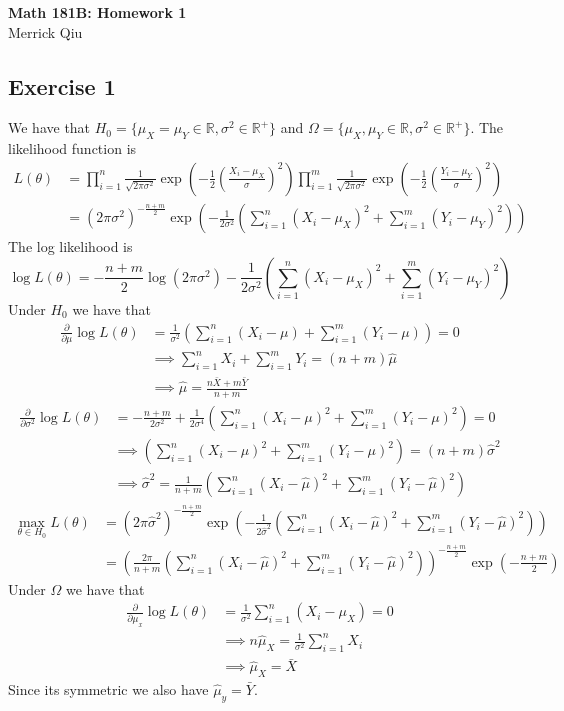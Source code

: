 \documentclass{article}
\newcommand{\sumN}{\sum_{i=1}^{n}}
\newcommand{\sumM}{\sum_{i=1}^{m}}
\newcommand{\prodN}{\prod_{i=1}^{n}}
\newcommand{\prodM}{\prod_{i=1}^{m}}
\begin{document}
\begin{center}
	\huge{\bf Math 181B: Homework 1} \\
	Merrick Qiu 
\end{center}

\subsection*{Exercise 1}
We have that 
$H_0 = \{\mu_X = \mu_Y \in \mathbb{R}, \sigma^2 \in \mathbb{R}^+\}$ and
$\Omega = \{\mu_X, \mu_Y \in \mathbb{R}, \sigma^2 \in \mathbb{R}^+\}$.
The likelihood function is 
\begin{align*}
	L(\theta) &= \prodN \frac{1}{\sqrt{2\pi\sigma^2}} \exp\left(-\frac{1}{2}\left(\frac{X_i-\mu_X}{\sigma}\right)^2\right)
				 \prodM \frac{1}{\sqrt{2\pi\sigma^2}} \exp\left(-\frac{1}{2}\left(\frac{Y_i-\mu_Y}{\sigma}\right)^2\right) \\
	&= (2\pi\sigma^2)^{-\frac{n+m}{2}} \exp \left(-\frac{1}{2\sigma^2}\left(\sumN (X_i - \mu_X)^2 + \sumM (Y_i - \mu_Y)^2 \right)\right)
\end{align*}
The log likelihood is 
\[
	\log L(\theta) = -\frac{n+m}{2} \log(2\pi\sigma^2) -\frac{1}{2\sigma^2}\left(\sumN (X_i - \mu_X)^2 + \sumM (Y_i - \mu_Y)^2\right)
\]
Under $H_0$ we have that 
\begin{align*}
	\frac{\partial}{\partial \mu } \log L(\theta) &=
	\frac{1}{\sigma^2}\left(\sumN (X_i - \mu) + \sumM (Y_i - \mu)\right)
	= 0 \\
	&\implies \sumN X_i + \sumM Y_i = (n+m)\hat{\mu} \\
	&\implies \hat{\mu} = \frac{n\bar{X} + m\bar{Y}}{n+m} 
\end{align*}
\begin{align*}
	\frac{\partial}{\partial \sigma^2 } \log L(\theta) &=
	-\frac{n+m}{2\sigma^2} +\frac{1}{2\sigma^4}\left(\sumN (X_i - \mu)^2 + \sumM (Y_i - \mu)^2\right)
	= 0 \\
	&\implies \left(\sumN (X_i - \mu)^2 + \sumM (Y_i - \mu)^2\right) = (n+m)\hat{\sigma}^2 \\
	&\implies \hat{\sigma}^2 = \frac{1}{n+m}\left(\sumN (X_i - \hat{\mu})^2 + \sumM (Y_i - \hat{\mu})^2\right)
\end{align*}
\begin{align*}
	\max_{\theta \in H_0} L(\theta) &=
	(2\pi\hat{\sigma}^2)^{-\frac{n+m}{2}} \exp \left(-\frac{1}{2\hat{\sigma}^2}\left(\sumN (X_i - \hat{\mu})^2 + \sumM (Y_i - \hat{\mu})^2 \right)\right) \\
	&= \left(\frac{2\pi}{n+m}\left(\sumN (X_i - \hat{\mu})^2 + \sumM (Y_i - \hat{\mu})^2\right)\right)^{-\frac{n+m}{2}} \exp\left(-\frac{n+m}{2}\right)
\end{align*}
Under $\Omega$ we have that 
\begin{align*}
	\frac{\partial}{\partial \mu_x } \log L(\theta) &=
	\frac{1}{\sigma^2}\sumN (X_i - \mu_X)
	= 0 \\
	&\implies n\hat{\mu}_X = \frac{1}{\sigma^2}\sumN X_i \\
	&\implies \hat{\mu}_X = \bar{X} 
\end{align*}
Since its symmetric we also have $\hat{\mu}_y = \bar{Y}$.
\end{document}
